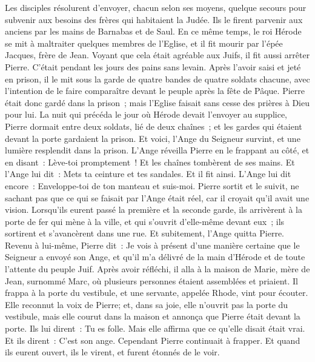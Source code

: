 \begin{multicols}{2}
Les disciples résolurent d'envoyer, chacun selon ses moyens, quelque secours pour subvenir aux besoins des frères qui habitaient la Judée.
Ils le firent parvenir aux anciens par les mains de Barnabas et de Saul.
\VerseOne{}En ce même temps, le roi Hérode se mit à maltraiter quelques membres de l'Eglise,
et il fit mourir par l'épée Jacques, frère de Jean.
Voyant que cela était agréable aux Juifs, il fit aussi arrêter Pierre. C'était pendant les jours des pains sans levain.
Après l'avoir saisi et jeté en prison, il le mit sous la garde de quatre bandes de quatre soldats chacune, avec l'intention de le faire comparaître devant le peuple après la fête de Pâque.
Pierre était donc gardé dans la prison~; mais l'Eglise faisait sans cesse des prières à Dieu pour lui.
La nuit qui précéda le jour où Hérode devait l'envoyer au supplice, Pierre dormait entre deux soldats, lié de deux chaînes~; et les gardes qui étaient devant la porte gardaient la prison.
Et voici, l'Ange du Seigneur survint, et une lumière resplendit dans la prison. L'Ange réveilla Pierre en le frappant au côté, et en disant~: Lève-toi promptement~! Et les chaînes tombèrent de ses mains.
Et l'Ange lui dit~: Mets ta ceinture et tes sandales. Et il fit ainsi. L'Ange lui dit encore~: Enveloppe-toi de ton manteau et suis-moi.
Pierre sortit et le suivit, ne sachant pas que ce qui se faisait par l'Ange était réel, car il croyait qu'il avait une vision.
Lorsqu'ils eurent passé la première et la seconde garde, ils arrivèrent à la porte de fer qui mène à la ville, et qui s'ouvrit d'elle-même devant eux~; ils sortirent et s'avancèrent dans une rue. Et subitement, l'Ange quitta Pierre.
Revenu à lui-même, Pierre dit~: Je vois à présent d'une manière certaine que le Seigneur a envoyé son Ange, et qu'il m'a délivré de la main d'Hérode et de toute l'attente du peuple Juif.
Après avoir réfléchi, il alla à la maison de Marie, mère de Jean, surnommé Marc, où plusieurs personnes étaient assemblées et priaient.
Il frappa à la porte du vestibule, et une servante, appelée Rhode, vint pour écouter.
Elle reconnut la voix de Pierre; et, dans sa joie, elle n'ouvrit pas la porte du vestibule, mais elle courut dans la maison et annonça que Pierre était devant la porte.
Ils lui dirent~: Tu es folle. Mais elle affirma que ce qu'elle disait était vrai.
Et ils dirent~: C'est son ange. Cependant Pierre continuait à frapper. Et quand ils eurent ouvert, ils le virent, et furent étonnés de le voir.

\end{multicols}
